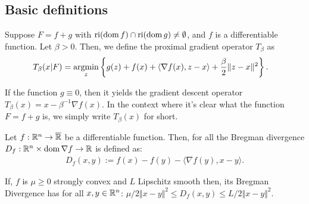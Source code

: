 \documentclass[12pt]{article}
\begin{document}
    \subsection{Basic definitions}
        \begin{definition}\label{def:pg-opt}
            Suppose $F = f + g$ with $\operatorname{ri}(\operatorname{dom} f) \cap \operatorname{ri}(\operatorname{dom} g) \neq \emptyset$, and $f$ is a differentiable function. 
            Let $\beta > 0$. 
            Then, we define the proximal gradient operator $T_{\beta}$ as 
            \begin{align*}
                T_\beta (x | F) &= \mathop{\rm argmin}\limits_{z} \left\lbrace
                    g(z) + f(x) + \langle \nabla f(x), z - x\rangle + \frac{\beta}{2}\Vert z - x\Vert^2
                \right\rbrace. 
            \end{align*}
        \end{definition}
        \begin{remark}
            If the function $g \equiv 0$, then it yields the gradient descent operator $T_\beta(x) = x - \beta^{-1}\nabla f(x)$. 
            In the context where it's clear what the function $F = f + g$ is, we simply write $T_\beta(x)$ for short. 
        \end{remark}
        \begin{definition}
            Let $f:\mathbb R^n \rightarrow \overline {\mathbb R}$ be a differentiable function. 
            Then, for all the Bregman divergence $D_f: \mathbb R^n \times \operatorname{dom}\nabla f \rightarrow \mathbb R$ is defined as: 
            \begin{align*}
                D_f(x, y) := f(x) - f(y) - \langle \nabla f(y), x - y\rangle. 
            \end{align*}
        \end{definition}
        \begin{remark}
            If, $f$ is $\mu \ge 0$ strongly convex and $L$ Lipschitz smooth then, its Bregman Divergence has for all $x, y \in \mathbb R^n$: $\mu/2 \Vert x - y\Vert^2 \le D_f(x, y) \le L/2 \Vert x - y\Vert^2$. 
        \end{remark}
\end{document}
